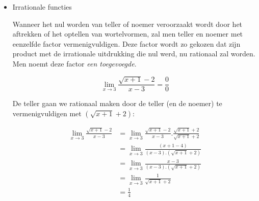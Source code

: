 \begin{itemize}
\begin{voorbeeld}
teller: $x\text{\texttwosuperior}-9=(x-3)(x+3)$

noemer (via Horner): %
\begin{tabular}{cc|ccc}
	&  & $1$ & $1$ & $-12$\\
	& $3$ & $\downarrow$ & $3$ & $12$\\
	\cline{2-5} 
	&  & $1$ & \multicolumn{1}{c||}{$4$} & $0$\\
\end{tabular}

dus \begin{equation*}
x\text{\texttwosuperior}+x-12=(x-3)(x+4)
\end{equation*}

zodat \begin{equation}
{\displaystyle {\displaystyle \lim_{x\to3}}\frac{x\text{\texttwosuperior}-4}{x\text{\texttwosuperior}-7x+10}={\displaystyle \lim_{x\to3}}\frac{(x-3)(x+3)}{(x-3)(x+4)}={\displaystyle \lim_{x\to3}}\frac{(x+3)}{(x+4)}=\frac{3+3}{3+4}=\frac{6}{7}}
\end{equation}
\end{voorbeeld}


\item{Irrationale functies}

Wanneer het nul worden van teller of noemer veroorzaakt wordt door
het aftrekken of het optellen van wortelvormen, zal men teller en
noemer met eenzelfde factor vermenigvuldigen. Deze factor wordt zo
gekozen dat zijn product met de irrationale uitdrukking die nul werd,
nu rationaal zal worden. Men noemt deze factor \emph{een toegevoegde}.


\begin{voorbeeld}
	\begin{equation*}
{\displaystyle {\displaystyle \lim_{x\to3}}\frac{\sqrt{x+1}-2}{x-3}=\frac{0}{0}}
\end{equation*}

De teller gaan we rationaal maken door de teller (en de noemer) te
vermenigvuldigen met $\left(\sqrt{x+1}+2\right)$:

\begin{equation*}
\begin{array}{cl}
{\displaystyle {\displaystyle \lim_{x\to3}}\frac{\sqrt{x+1}-2}{x-3}} & {\displaystyle ={\displaystyle \lim_{x\to3}}\frac{\sqrt{x+1}-2}{x-3}.\frac{\sqrt{x+1}+2}{\sqrt{x+1}+2}}\\
& {\displaystyle ={\displaystyle \lim_{x\to3}}\frac{\left(x+1-4\right)}{\left(x-3\right).\left(\sqrt{x+1}+2\right)}}\\
& {\displaystyle ={\displaystyle \lim_{x\to3}}\frac{x-3}{\left(x-3\right).\left(\sqrt{x+1}+2\right)}}\\
& {\displaystyle ={\displaystyle \lim_{x\to3}}\frac{1}{\sqrt{x+1}+2}}\\
& =\frac{1}{4}
\end{array}
\end{equation*}
\end{voorbeeld}


\end{itemize}
